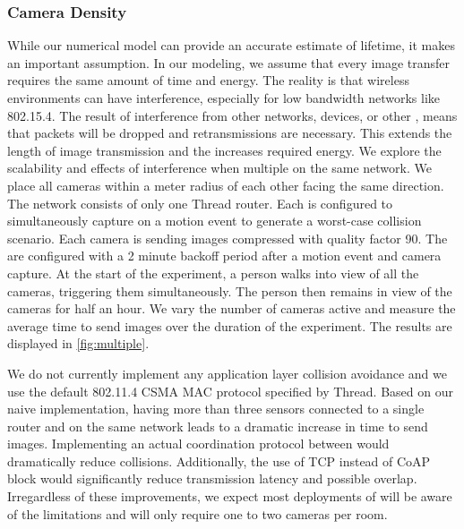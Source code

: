 \subsubsection{Camera Density}
While our numerical model can provide an accurate estimate of lifetime, it makes an important assumption. In our modeling, we assume that every image transfer requires the same amount of time and energy. The reality is that wireless environments can have interference, especially for low bandwidth networks like 802.15.4. The result of interference from other networks, devices, or other \namecs, means that packets will be dropped and retransmissions are necessary. This extends the length of image transmission and the increases required energy. 
We explore the scalability and effects of interference when multiple \namecs on the same network. We place all cameras within a meter radius of each other facing the same direction. The network consists of only one Thread router. Each \name is configured to simultaneously capture on a motion event to generate a worst-case collision scenario. Each camera is sending images compressed with quality factor 90.
The \namecs are configured with a 2 minute backoff period after a motion event and camera capture. At the start of the experiment, a person walks into view of all the cameras, triggering them simultaneously. The person then remains in view of the cameras for half an hour. We vary the number of cameras active and measure the average time to send images over the duration of the experiment. The results are displayed in \cref{fig:multiple}.


We do not currently implement any application layer collision avoidance and we use the default 802.11.4 CSMA MAC protocol specified by Thread. Based on our naive implementation, having more than three \name sensors connected to a single router and on the same network leads to a dramatic increase in time to send images. Implementing an actual coordination protocol between \namecs would dramatically reduce collisions. Additionally, the use of  TCP instead of CoAP block would significantly reduce transmission latency and possible overlap.
Irregardless of these improvements, we expect most deployments of \name will be aware of the limitations and will only require one to two cameras per room.

